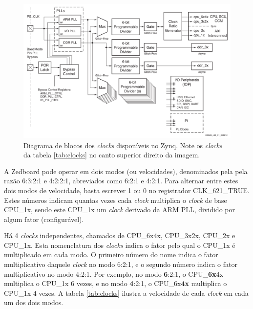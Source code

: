 \begin{figure}[ht!]
	\centerline{
    \includegraphics[width=13cm]{figuras/clocks}
	}
    \caption{Diagrama de blocos dos \emph{clocks} disponíveis no Zynq. Note os \emph{clocks} da tabela \ref{tab:clocks} no canto superior direito da imagem.}
	\label{fig:clocks}
\end{figure}

A Zedboard pode operar em dois modos (ou velocidades), denominados pela pela razão 6:3:2:1 e 4:2:2:1, abreviados como 6:2:1 e 4:2:1. Para alternar entre estes dois modos de velocidade, basta escrever 1 ou 0 no registrador CLK\_621\_TRUE. Estes números indicam quantas vezes cada \emph{clock} multiplica o \emph{clock} de base CPU\_1x, sendo este CPU\_1x um \emph{clock} derivado da ARM PLL, dividido por algum fator (configurável).

Há 4 \emph{clocks} independentes, chamados de CPU\_6x4x, CPU\_3x2x, CPU\_2x e CPU\_1x. Esta nomenclatura dos \emph{clocks} indica o fator pelo qual o CPU\_1x é multiplicado em cada modo.
O primeiro número do nome indica o fator multiplicativo daquele \emph{clock} no modo 6:2:1, e o segundo número indica o fator multiplicativo no modo 4:2:1.
Por exemplo, no modo \textbf{6}:2:1, o CPU\_\textbf{6x}4x multiplica o CPU\_1x 6 vezes, e no modo \textbf{4}:2:1, o CPU\_6x\textbf{4x} multiplica o CPU\_1x 4 vezes. A tabela \ref{tab:clocks} ilustra a velocidade de cada \emph{clock} em cada um dos dois modos.

